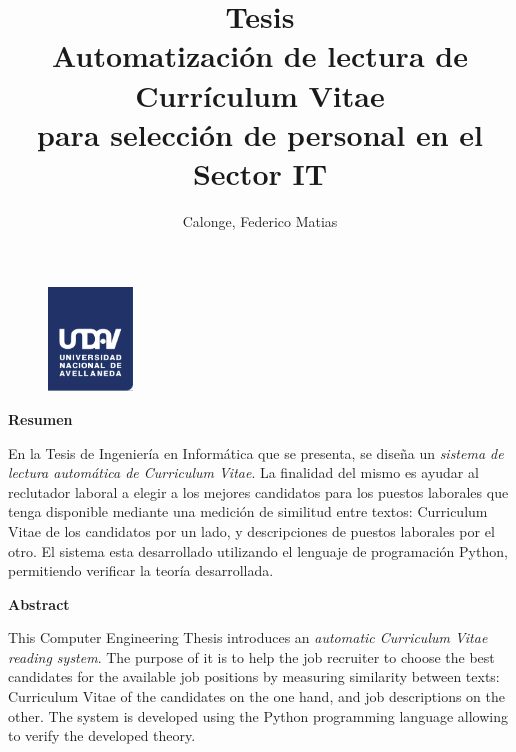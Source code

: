 \documentclass[12pt,a4paper]{article}
\author{
  Calonge, Federico Matias\\
  \text{calongefederico@gmail.com}
}
\title{
  Tesis \\
  \large Automatización de lectura de Currículum Vitae  \\
    para selección de personal en el Sector IT}
\begin{document}
\begin{figure}
  \centering
  \includegraphics[width=0.2\textwidth]{images/undav-logo.png} 	%
  \label{fig:undav-logo}
\end{figure}
\maketitle       		%

\cleardoublepage    %

\begin{center}
    \Large
    \vspace{0.9cm}
    \textbf{Resumen}
    
\end{center}

En la Tesis de Ingeniería en Informática que se presenta, se diseña un \textit{sistema de lectura automática de Curriculum Vitae}. La finalidad del mismo es ayudar al reclutador laboral a elegir a los mejores candidatos para los puestos laborales que tenga disponible mediante una medición de similitud entre textos: Curriculum Vitae de los candidatos por un lado, y descripciones de puestos laborales por el otro.
El sistema esta desarrollado utilizando el lenguaje de programación Python, permitiendo verificar la teoría desarrollada.

\begin{center}
    \Large
    \vspace{0.9cm}
    \textbf{Abstract}
\end{center}

This Computer Engineering Thesis introduces an \textit{automatic Curriculum Vitae reading system}. The purpose of it is to help the job recruiter to choose the best candidates for the available job positions by measuring similarity between texts: Curriculum Vitae of the candidates on the one hand, and job descriptions on the other. The system is developed using the Python programming language allowing to verify the developed theory.

\cleardoublepage    %

\tableofcontents 	%
\end{document}
